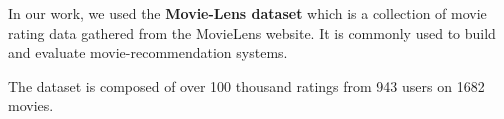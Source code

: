 In our work, we used the \textbf{Movie-Lens dataset} \cite{grouplens} which is a collection of movie rating data gathered from the MovieLens website. It is commonly used to build and evaluate movie-recommendation systems.

The dataset is composed of over 100 thousand ratings from 943 users on 1682 movies.